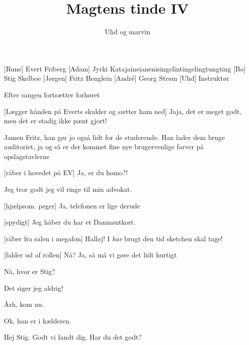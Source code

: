 \documentclass[a4paper,11pt]{article}
\title{Magtens tinde IV}
\author{Uhd og marvin}
\begin{document}
\maketitle

\begin{roles}
  [Rune] Evert Friberg
  [Adam] Jyrki Katajaineianenisingelintingelingtungting
  [Bo] Stig Skelboe
  [Jørgen] Fritz Henglein
  [Andr\'e] Georg Strøm
  [Uhd] Instruktør
\end{roles}

\begin{props}
\end{props}

\begin{sketch}
  
  \scene Efter sangen fortsætter forhøret

  [Lægger hånden på Everts skulder og sætter ham ned] Jaja, det er
  meget godt, men det er stadig ikke pænt gjort!
  
   Jamen Fritz, han gør jo også lidt for de studerende. Han
  lader dem bruge auditoriet, ja og så er der kommet fine nye
  brugervenlige farver på opslagstavlerne
  
  [råber i hovedet på EV] Ja, er du homo?!
  
  Jeg tror godt jeg vil ringe til min advokat.

  [hjælpsom. peger] Ja, telefonen er lige derude


  [spydigt] Jeg håber du har et Danmøntkort.

  [råber fra salen i megafon] Halløj! I \emph{har} brugt den tid sketchen
  skal tage!

  [falder ud af rollen] Nå? Ja, så må vi gøre det lidt hurtigt


   Nå, hvor er Stig?

   Det siger jeg aldrig!

   Årh, kom nu. 

   Ok, han er i kælderen.


   Hej Stig. Godt vi fandt dig. Har du det godt?


\end{sketch}
\end{document}
